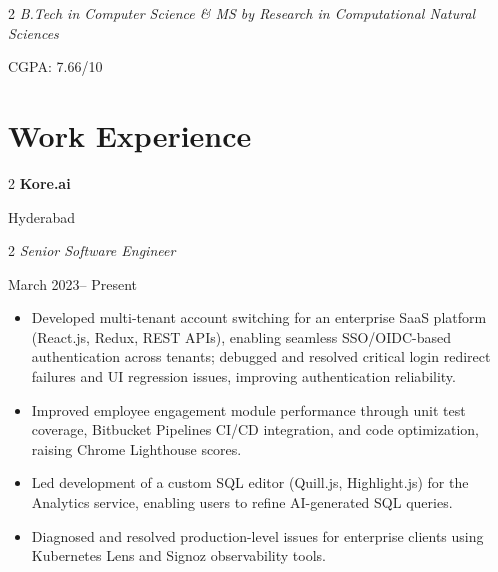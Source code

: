 \documentclass[10pt, letterpaper]{article}
\renewcommand\labelitemi{$\vcenter{\hbox{\small$\bullet$}}$} %
\newenvironment{twocolentry}[2][]{
    \onecolentry
    \def\secondColumn{#2}
    \setcolumnwidth{\fill, 5.5 cm}
    \begin{paracol}{2}
}{
    \switchcolumn \raggedleft \secondColumn
    \end{paracol}
    \endonecolentry
} %
\newcommand{\onecolentrywrapbullet}[1]{%
  \begin{itemize}[leftmargin=*, itemsep=0pt, parsep=0pt, topsep=0pt, partopsep=0pt] %
    \item \begin{minipage}[t]{\dimexpr\textwidth-1.1em\relax} %
       #1
    \end{minipage}
  \end{itemize}
  \vspace{4pt}
}
\newcommand{\twocolentryWithSpace}[3][0.5em]{%
  \begin{twocolentry}{#2}{#3}%
  \end{twocolentry}%
  \vspace{#1}%
}
\newenvironment{customitemize}{
  \begin{itemize}[leftmargin=1.5em, itemsep=0.5em, parsep=0pt, topsep=0.5em, partopsep=0pt] %
    \setlength{\itemindent}{-0.5em} %
    \renewcommand{\labelitemi}{\raisebox{0.25ex}{\normalsize$\bullet$}} %
}{
  \end{itemize}
}
\begin{document}
\begin{twocolentry}
{CGPA: 7.66/10}{\small \textit{B.Tech in Computer Science \& MS by Research in Computational Natural Sciences}}
\end{twocolentry}


\section{Work Experience}
\begin{twocolentry}
   {Hyderabad} {\textbf{Kore.ai}}
\end{twocolentry}
\begin{twocolentry}
   {March 2023-- Present} {\textit{Senior Software Engineer}}
\end{twocolentry}


\begin{customitemize}
    \item Developed multi-tenant account switching for an enterprise SaaS platform (React.js, Redux, REST APIs), enabling seamless SSO/OIDC-based authentication across tenants; debugged and resolved critical login redirect failures and UI regression issues, improving authentication reliability.
    \item Improved employee engagement module performance through unit test coverage, Bitbucket Pipelines CI/CD integration, and code optimization, raising Chrome Lighthouse scores.
    \item Led development of a custom SQL editor (Quill.js, Highlight.js) for the Analytics service, enabling users to refine AI-generated SQL queries.
    \item Diagnosed and resolved production-level issues for enterprise clients using Kubernetes Lens and Signoz observability tools.
\end{customitemize}



\end{document}
